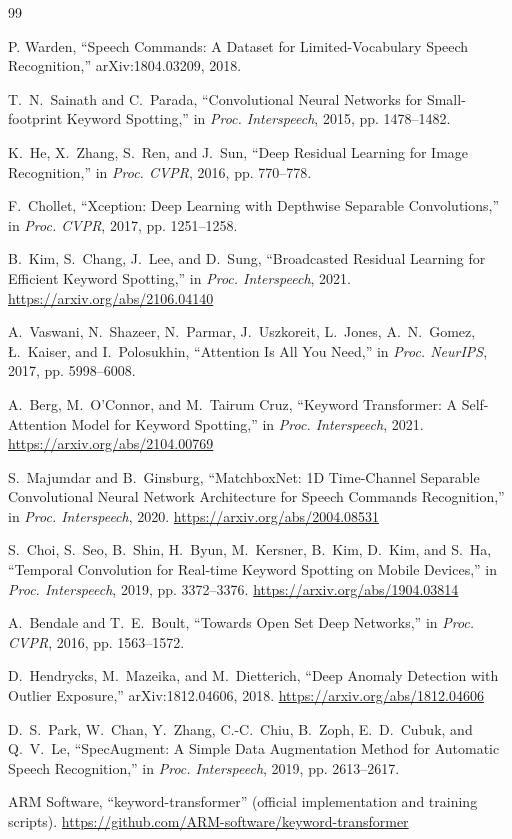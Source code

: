\documentclass[11pt]{article}
\begin{document}
\begin{thebibliography}{99}

P. Warden, ``Speech Commands: A Dataset for Limited-Vocabulary Speech Recognition,'' arXiv:1804.03209, 2018.

T.~N.~Sainath and C.~Parada, ``Convolutional Neural Networks for Small-footprint Keyword Spotting,'' in \textit{Proc. Interspeech}, 2015, pp. 1478--1482.

K.~He, X.~Zhang, S.~Ren, and J.~Sun, ``Deep Residual Learning for Image Recognition,'' in \textit{Proc. CVPR}, 2016, pp. 770--778.

F.~Chollet, ``Xception: Deep Learning with Depthwise Separable Convolutions,'' in \textit{Proc. CVPR}, 2017, pp. 1251--1258.

B.~Kim, S.~Chang, J.~Lee, and D.~Sung, ``Broadcasted Residual Learning for Efficient Keyword Spotting,'' in \textit{Proc. Interspeech}, 2021. \url{https://arxiv.org/abs/2106.04140}

A.~Vaswani, N.~Shazeer, N.~Parmar, J.~Uszkoreit, L.~Jones, A.~N.~Gomez, Ł.~Kaiser, and I.~Polosukhin, ``Attention Is All You Need,'' in \textit{Proc. NeurIPS}, 2017, pp. 5998--6008.

A.~Berg, M.~O'Connor, and M.~Tairum Cruz, ``Keyword Transformer: A Self-Attention Model for Keyword Spotting,'' in \textit{Proc. Interspeech}, 2021. \url{https://arxiv.org/abs/2104.00769}

S.~Majumdar and B.~Ginsburg, ``MatchboxNet: 1D Time-Channel Separable Convolutional Neural Network Architecture for Speech Commands Recognition,'' in \textit{Proc. Interspeech}, 2020. \url{https://arxiv.org/abs/2004.08531}

S.~Choi, S.~Seo, B.~Shin, H.~Byun, M.~Kersner, B.~Kim, D.~Kim, and S.~Ha, ``Temporal Convolution for Real-time Keyword Spotting on Mobile Devices,'' in \textit{Proc. Interspeech}, 2019, pp. 3372--3376. \url{https://arxiv.org/abs/1904.03814}

A.~Bendale and T.~E.~Boult, ``Towards Open Set Deep Networks,'' in \textit{Proc. CVPR}, 2016, pp. 1563--1572.

D.~Hendrycks, M.~Mazeika, and M.~Dietterich, ``Deep Anomaly Detection with Outlier Exposure,'' arXiv:1812.04606, 2018. \url{https://arxiv.org/abs/1812.04606}

D.~S.~Park, W.~Chan, Y.~Zhang, C.-C.~Chiu, B.~Zoph, E.~D.~Cubuk, and Q.~V.~Le, ``SpecAugment: A Simple Data Augmentation Method for Automatic Speech Recognition,'' in \textit{Proc. Interspeech}, 2019, pp. 2613--2617.

ARM Software, ``keyword-transformer'' (official implementation and training scripts). \url{https://github.com/ARM-software/keyword-transformer}

\end{thebibliography}
\end{document}
